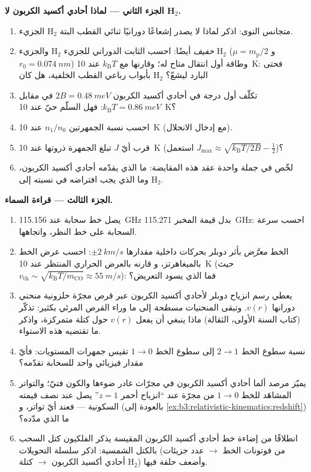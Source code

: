 \begin{problem}
\medskip\noindent\textbf{الجزء الثاني --- لماذا أحادي أكسيد الكربون لا H$_2$.}
\begin{enumerate}[resume]
  \item الجزيء H$_2$ متجانس النوى: اذكر لماذا لا يصدر إشعاعًا
        دورانيًا ثنائي القطب البتة.
  \item والجزيء H$_2$ \emph{خفيف} أيضًا: احسب الثابت
        الدوراني للجزيء H$_2$ ($\mu = m_{\text{p}}/2$ و $r_0 = \qty{0.074}{nm}$)
        وطاقة أول انتقال متاح له؛ وقارنها مع
        $k_{\text{B}}T$ عند \qty{10}{K}: فحتى بأبواب رباعي القطب
        الخلفية، هل كان H$_2$ البارد ليشعّ؟
  \item تكلّف أول درجة في أحادي أكسيد الكربون $2B = \qty{0.48}{meV}$ في مقابل
        $k_{\text{B}}T = \qty{0.86}{meV}$: فهل السلّم حيّ عند
        \qty{10}{K}؟
  \item احسب نسبة الجمهرتين $n_1/n_0$ عند \qty{10}{K}
        (مع إدخال الانحلال).
  \item قرب أيّ $J$ تبلغ الجمهرة ذروتها عند \qty{10}{K}
        (استعمل $J_{\max} \approx \sqrt{k_{\text{B}}T/2B} - \tfrac12$)؟
  \item لخّص في جملة واحدة عقد هذه المقايضة: ما الذي يقدّمه
        أحادي أكسيد الكربون، وما الذي يجب افتراضه في نسبته إلى
        H$_2$.
\end{enumerate}

\medskip\noindent\textbf{الجزء الثالث --- قراءة السماء.}
\begin{enumerate}[resume]
  \item يصل خط سحابة عند \qty{115.156}{GHz} بدل قيمة
        المخبر \qty{115.271}{GHz}: احسب سرعة السحابة
        على خط النظر، واتجاهها.
  \item الخط \emph{معرَّض} بأثر دوبلر بحركات داخلية مقدارها
        $\pm\qty{2}{km/s}$: احسب عرض الخط بالميغاهرتز، و
        قارنه بالعرض الحراري المنتظر عند \qty{10}{K}
        (حيث $v_{\text{th}} \sim \sqrt{k_{\text{B}}T/m_{\text{CO}}}
        \approx \qty{55}{m/s}$): فما الذي يسود التعريض؟
  \item يعطي رسم انزياح دوبلر لأحادي أكسيد الكربون عبر قرص مجرّة حلزونية
        منحني دورانها $v(r)$. وتبقى المنحنيات
        \emph{مسطحة} إلى ما وراء القرص المرئي بكثير: تذكّر (كتاب السنة
        الأولى، الثقالة) ماذا ينبغي أن يفعل $v(r)$ حول كتلة
        متمركزة، واذكر ما تقتضيه هذه الاستواء.
  \item نسبة سطوع الخط $2\to1$ إلى سطوع الخط
        $1\to0$ تقيس جمهرات المستويات: فأيّ مقدار فيزيائي
        واحد للسحابة تقدّمه؟
  \item يميّز مرصد ألما أحادي أكسيد الكربون في مجرّات غادر ضوءها والكون
        فتيّ؛ والتواتر المشاهَد للخط
        $1 \to 0$ من مجرّة عند ``انزياح أحمر $z = 1$''
        يصل عند نصف قيمته السكونية --- فعند أيّ تواتر، و
        (بالعودة إلى \cref{ex:b3:relativistic-kinematics:redshift})
        ما الذي مدّده؟
  \item انطلاقًا من إضاءة خط أحادي أكسيد الكربون المقيسة يذكر الفلكيون كتل
        السحب بالكتل الشمسية: اذكر سلسلة التحويلات (من فوتونات الخط
        $\to$ عدد جزيئات أحادي أكسيد الكربون $\to$ كتلة H$_2$) وأضعف
        حلقة فيها.
\end{enumerate}


\end{problem}
